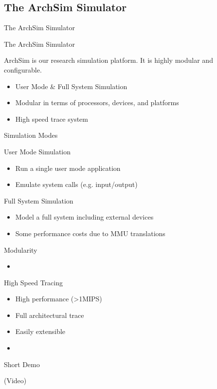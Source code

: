 \subsection{The ArchSim Simulator}

\begin{frame}{The ArchSim Simulator}

\end{frame}

\begin{frame}{The ArchSim Simulator}

ArchSim is our research simulation platform. It is highly modular and configurable.

\begin{itemize}
	\item User Mode \& Full System Simulation
	\item Modular in terms of processors, devices, and platforms
	\item High speed trace system
\end{itemize}

\end{frame}

\begin{frame}{Simulation Modes}

User Mode Simulation
\begin{itemize}
	\item Run a single user mode application
	\item Emulate system calls (e.g. input/output)
\end{itemize}

\bigskip

Full System Simulation
\begin{itemize}
	\item Model a full system including external devices
	\item Some performance costs due to MMU translations
\end{itemize}

\end{frame}

\begin{frame}{Modularity}

\begin{itemize}
	\item 
\end{itemize}


\end{frame}

\begin{frame}{High Speed Tracing}

\begin{itemize}
	\item High performance (>1MIPS)
	\item Full architectural trace
	\item Easily extensible
	\item 
\end{itemize}

\end{frame}

\begin{frame}{Short Demo}

(Video)

\end{frame}
